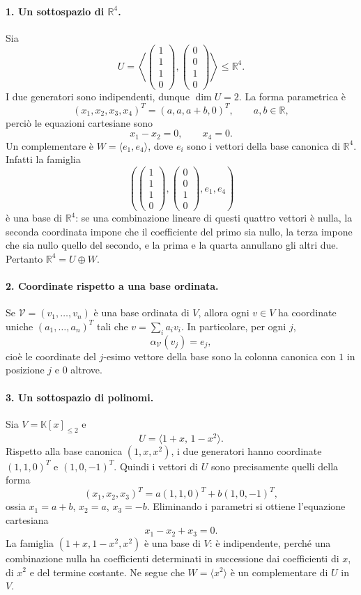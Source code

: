 \documentclass[11pt,a4paper]{article}
\newcommand{\RR}{\mathbb{R}}
\newcommand{\KK}{\mathbb{K}}
\theoremstyle{plain}
\theoremstyle{definition}
\theoremstyle{remark}
\begin{document}
\paragraph{1. Un sottospazio di $\RR^4$.}
Sia
\[
 U=\left\langle
 \begin{pmatrix}1\\1\\1\\0\end{pmatrix},
 \begin{pmatrix}0\\0\\1\\0\end{pmatrix}
 \right\rangle\leq\RR^4.
\]
I due generatori sono indipendenti, dunque $\dim U=2$. La forma parametrica è
\[
 (x_1,x_2,x_3,x_4)^T=(a,a,a+b,0)^T,\qquad a,b\in\RR,
\]
perciò le equazioni cartesiane sono
\[
 x_1-x_2=0,\qquad x_4=0.
\]
Un complementare è $W=\langle e_1,e_4\rangle$, dove $e_i$ sono i vettori della base canonica di $\RR^4$. Infatti la famiglia
\[
 \left(\begin{pmatrix}1\\1\\1\\0\end{pmatrix},
 \begin{pmatrix}0\\0\\1\\0\end{pmatrix},e_1,e_4\right)
\]
è una base di $\RR^4$: se una combinazione lineare di questi quattro vettori è nulla, la seconda coordinata impone che il coefficiente del primo sia nullo, la terza impone che sia nullo quello del secondo, e la prima e la quarta annullano gli altri due. Pertanto $\RR^4=U\oplus W$.

\paragraph{2. Coordinate rispetto a una base ordinata.}
Se $\mathcal V=(v_1,\ldots,v_n)$ è una base ordinata di $V$, allora ogni $v\in V$ ha coordinate uniche $(a_1,\ldots,a_n)^T$ tali che $v=\sum_i a_iv_i$. In particolare, per ogni $j$,
\[
 \alpha_{\mathcal V}(v_j)=e_j,
\]
cioè le coordinate del $j$-esimo vettore della base sono la colonna canonica con $1$ in posizione $j$ e $0$ altrove.

\paragraph{3. Un sottospazio di polinomi.}
Sia $V=\KK[x]_{\leq2}$ e
\[
 U=\langle 1+x,\,1-x^2\rangle.
\]
Rispetto alla base canonica $(1,x,x^2)$, i due generatori hanno coordinate $(1,1,0)^T$ e $(1,0,-1)^T$. Quindi i vettori di $U$ sono precisamente quelli della forma
\[
 (x_1,x_2,x_3)^T=a(1,1,0)^T+b(1,0,-1)^T,
\]
ossia $x_1=a+b$, $x_2=a$, $x_3=-b$. Eliminando i parametri si ottiene l'equazione cartesiana
\[
 x_1-x_2+x_3=0.
\]
La famiglia $(1+x,1-x^2,x^2)$ è una base di $V$: è indipendente, perché una combinazione nulla ha coefficienti determinati in successione dai coefficienti di $x$, di $x^2$ e del termine costante. Ne segue che $W=\langle x^2\rangle$ è un complementare di $U$ in $V$.
\end{document}
